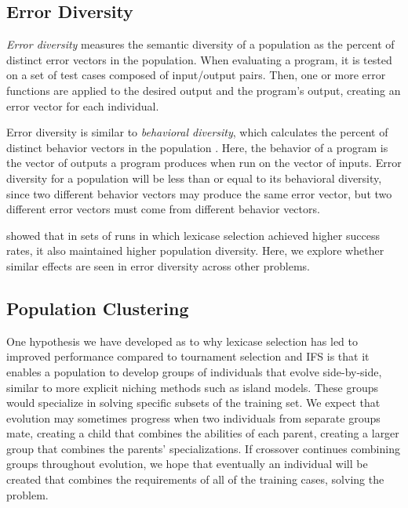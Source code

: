 \subsection{Error Diversity}
\label{sec:errorDiversityDef}

\textit{Error diversity} measures the semantic diversity of a population as the percent of distinct error vectors in the population. When evaluating a program, it is tested on a set of test cases composed of input/output pairs. Then, one or more error functions are applied to the desired output and the program's output, creating an error vector for each individual.

Error diversity is similar to \textit{behavioral diversity}, which calculates the percent of distinct behavior vectors in the population \citep{Jackson:2010:PPSN}. Here, the behavior of a program is the vector of outputs a program produces when run on the vector of inputs. Error diversity for a population will be less than or equal to its behavioral diversity, since two different behavior vectors may produce the same error vector, but two different error vectors must come from different behavior vectors.

\cite{Helmuth:2015:ieeeTEC} showed that in sets of runs in which lexicase selection achieved higher success rates, 
it also maintained higher population diversity. Here, we  explore whether similar 
effects are seen in error diversity across other problems.

\subsection{Population Clustering}
\label{sec:clusterCountDef}

One hypothesis we have developed as to why lexicase selection has led to improved performance compared to tournament selection and IFS is that it enables a population to develop groups of individuals that evolve side-by-side, similar to more explicit niching methods such as island models. These groups would specialize in solving specific subsets of the training set. We expect that evolution may sometimes progress when two individuals from separate groups mate, creating a child that combines the abilities of each parent, creating a larger group that combines the parents' specializations. If crossover continues combining groups throughout evolution, we hope that eventually an individual will be created that combines the requirements of all of the training cases, solving the problem.

